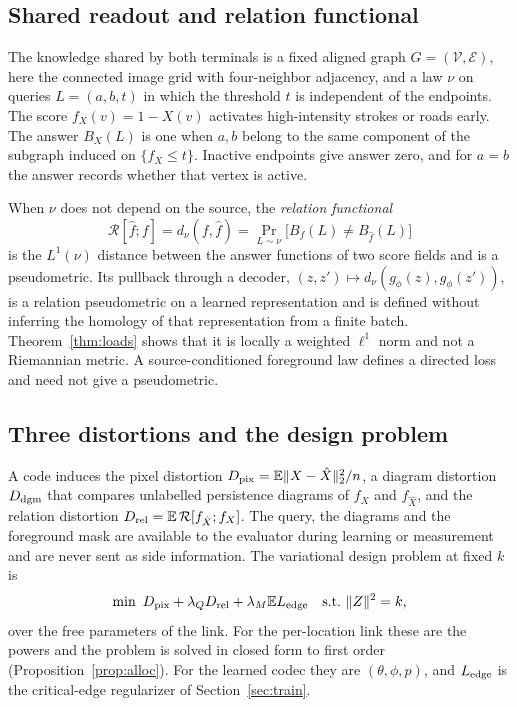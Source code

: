 \documentclass[10pt,conference]{IEEEtran}
\newcommand{\E}{\mathbb E}
\begin{document}
\subsection{Shared readout and relation functional}
The knowledge shared by both terminals is a fixed aligned graph $G=(\mathcal V,\mathcal E)$, here the connected image grid with four-neighbor adjacency, and a law $\nu$ on queries $L=(a,b,t)$ in which the threshold $t$ is independent of the endpoints. The score $f_X(v)=1-X(v)$ activates high-intensity strokes or roads early. The answer $B_X(L)$ is one when $a,b$ belong to the same component of the subgraph induced on $\{f_X\le t\}$. Inactive endpoints give answer zero, and for $a=b$ the answer records whether that vertex is active.

When $\nu$ does not depend on the source, the \emph{relation functional}
\begin{equation}
 \mathcal R[\hat f;f]=d_\nu(f,\hat f)=\Pr_{L\sim\nu}\big[B_f(L)\ne B_{\hat f}(L)\big]
\end{equation}
is the $L^1(\nu)$ distance between the answer functions of two score fields and is a pseudometric. Its pullback through a decoder, $(z,z')\mapsto d_\nu(g_\phi(z),g_\phi(z'))$, is a relation pseudometric on a learned representation and is defined without inferring the homology of that representation from a finite batch. Theorem~\ref{thm:loads} shows that it is locally a weighted $\ell^1$ norm and not a Riemannian metric. A source-conditioned foreground law defines a directed loss and need not give a pseudometric.

\subsection{Three distortions and the design problem}
A code induces the pixel distortion $D_{\rm pix}=\E\|X-\hat X\|_2^2/n$, a diagram distortion $D_{\rm dgm}$ that compares unlabelled persistence diagrams of $f_X$ and $f_{\hat X}$, and the relation distortion $D_{\rm rel}=\E\,\mathcal R[f_{\hat X};f_X]$. The query, the diagrams and the foreground mask are available to the evaluator during learning or measurement and are never sent as side information. The variational design problem at fixed $k$ is
\begin{equation}
 \min\ D_{\rm pix}+\lambda_QD_{\rm rel}+\lambda_M\E L_{\rm edge}
 \quad\text{s.t.}\ \|Z\|^2=k, \label{eq:problem}
\end{equation}
over the free parameters of the link. For the per-location link these are the powers and the problem is solved in closed form to first order (Proposition~\ref{prop:alloc}). For the learned codec they are $(\theta,\phi,p)$, and $L_{\rm edge}$ is the critical-edge regularizer of Section~\ref{sec:train}.
\end{document}
